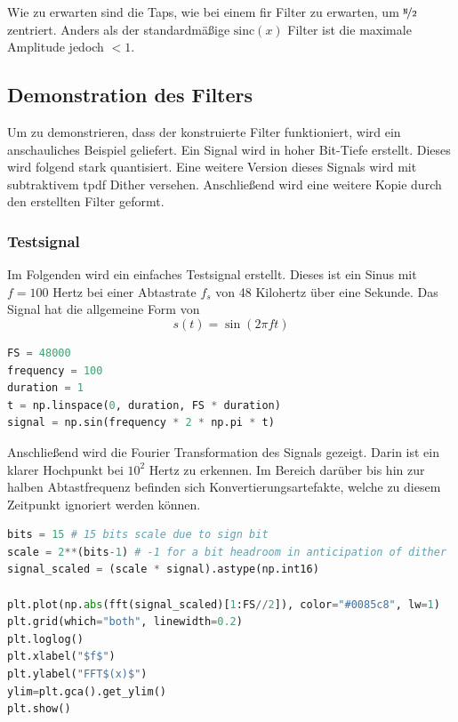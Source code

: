 Wie zu erwarten sind die Taps, wie bei einem \gls{fir} Filter zu
erwarten, um \(\nicefrac{\texttt{N}}{2}\) zentriert. Anders als der
standardmäßige \(\text{sinc} (x)\) Filter ist die maximale Amplitude
jedoch \(<1\).

\hypertarget{demonstration-des-filters}{%
\subsection{Demonstration des Filters}\label{demonstration-des-filters}}

Um zu demonstrieren, dass der konstruierte Filter funktioniert, wird ein
anschauliches Beispiel geliefert. Ein Signal wird in hoher Bit-Tiefe
erstellt. Dieses wird folgend stark quantisiert. Eine weitere Version
dieses Signals wird mit subtraktivem \gls{tpdf} Dither versehen.
Anschließend wird eine weitere Kopie durch den erstellten Filter
geformt.

\hypertarget{testsignal}{%
\subsubsection{Testsignal}\label{testsignal}}

Im Folgenden wird ein einfaches Testsignal erstellt. Dieses ist ein
Sinus mit \(f=100\) Hertz bei einer Abtastrate \(f_s\) von 48 Kilohertz
über eine Sekunde. Das Signal hat die allgemeine Form von
\[s(t) = \sin (2 \pi f t)\]

\begin{lstlisting}[language=Python]
FS = 48000
frequency = 100
duration = 1
t = np.linspace(0, duration, FS * duration)
signal = np.sin(frequency * 2 * np.pi * t)
\end{lstlisting}

Anschließend wird die Fourier Transformation des Signals gezeigt. Darin
ist ein klarer Hochpunkt bei \(10^2\) Hertz zu erkennen. Im Bereich
darüber bis hin zur halben Abtastfrequenz befinden sich
Konvertierungsartefakte, welche zu diesem Zeitpunkt ignoriert werden
können.

\begin{lstlisting}[language=Python]
bits = 15 # 15 bits scale due to sign bit
scale = 2**(bits-1) # -1 for a bit headroom in anticipation of dither
signal_scaled = (scale * signal).astype(np.int16)

plt.plot(np.abs(fft(signal_scaled)[1:FS//2]), color="#0085c8", lw=1)
plt.grid(which="both", linewidth=0.2)
plt.loglog()
plt.xlabel("$f$")
plt.ylabel("FFT$(x)$")
ylim=plt.gca().get_ylim()
plt.show()
\end{lstlisting}

